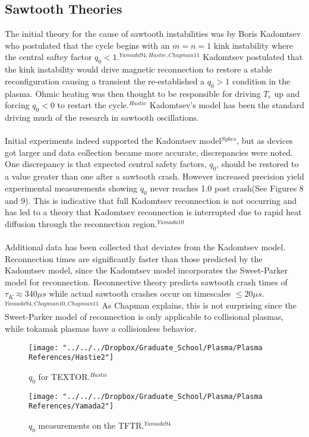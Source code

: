 \documentclass{article}
\begin{document}
\subsection{Sawtooth Theories}
The initial theory for the cause of sawtooth instabilities was by Boris Kadomtsev who postulated that the cycle begins with an $m=n=1$ kink instability where the central saftey factor $q_0<1$.$^{Yamada94,Hastie,Chapman11}$  Kadomtsev postulated that the kink instability would drive magnetic reconnection to restore a stable reconfiguration causing a transient the re-established a $q_0>1$ condition in the plasma.  Ohmic heating was then thought to be responsible for driving $T_e$ up and forcing $q_0<0$ to restart the cycle.$^{Hastie}$  Kadomtsev's model has been the standard driving much of the research in sawtooth oscillations.\\\\
Initial experiments indeed supported the Kadomtsev model$^{Sykes}$, but as devices got larger and data collection became more accurate, discrepancies were noted.  One discrepancy is that expected central safety factors, $q_0$, should be restored to a value greater than one after a sawtooth crash.  However increased precision yield experimental measurements showing $q_0$ never reaches 1.0 post crash(See Figures 8 and 9).  This is indicative that full Kadomtsev reconnection is not occurring and has led to a theory that Kadomtsev reconnection is interrupted due to rapid heat diffusion through the reconnection region.$^{Yamada10}$\\\\
Additional data has been collected that deviates from the Kadomtsev model.  Reconnection times are significantly faster than those predicted by the Kadomtsev model, since the Kadomtsev model incorporates the Sweet-Parker model for reconnection.  Reconnective theory predicts sawtooth crash times of $\tau_K \approx340 \mu s$ while actual sawtooth crashes occur on timescales $\leq20\mu s$.$^{Yamada94,Chapman10,Chapman11}$  As Chapman explains, this is not surprising since the Sweet-Parker model of reconnection is only applicable to collisional plasmas, while tokamak plasmas have a collisionless behavior.
\begin{figure}[h]
\centering
\texttt{[image: "../../../Dropbox/Graduate\_School/Plasma/Plasma References/Hastie2"]}
\caption{$q_0$ for TEXTOR.$^{Hastie}$}
\label{fig:Hastie2}
\end{figure}
\begin{figure}[h]
\centering
\texttt{[image: "../../../Dropbox/Graduate\_School/Plasma/Plasma References/Yamada2"]}
\caption{$q_0$ measurements on the TFTR.$^{Yamada94}$}
\label{fig:Yamada2}
\end{figure}
\end{document}
